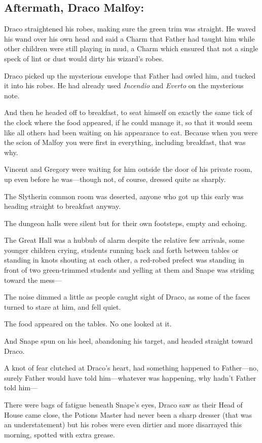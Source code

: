 \subsection{Aftermath, Draco Malfoy:}

\noindent{}Draco straightened his robes, making sure the green trim was straight. He waved his wand over his own head and said a Charm that Father had taught him while other children were still playing in mud, a Charm which ensured that not a single speck of lint or dust would dirty his wizard’s robes.

Draco picked up the mysterious envelope that Father had owled him, and tucked it into his robes. He had already used \emph{Incendio} and \emph{Everto} on the mysterious note.

And then he headed off to breakfast, to seat himself on exactly the same tick of the clock where the food appeared, if he could manage it, so that it would seem like all others had been waiting on his appearance to eat. Because when you were the scion of Malfoy you were first in everything, including breakfast, that was why.

Vincent and Gregory were waiting for him outside the door of his private room, up even before he was—though not, of course, dressed quite as sharply.

The Slytherin common room was deserted, anyone who got up this early was heading straight to breakfast anyway.

The dungeon halls were silent but for their own footsteps, empty and echoing.

The Great Hall was a hubbub of alarm despite the relative few arrivals, some younger children crying, students running back and forth between tables or standing in knots shouting at each other, a red-robed prefect was standing in front of two green-trimmed students and yelling at them and Snape was striding toward the mess—

The noise dimmed a little as people caught sight of Draco, as some of the faces turned to stare at him, and fell quiet.

The food appeared on the tables. No one looked at it.

And Snape spun on his heel, abandoning his target, and headed straight toward Draco.

A knot of fear clutched at Draco’s heart, had something happened to Father—no, surely Father would have told him—whatever was happening, why hadn’t Father told him—

There were bags of fatigue beneath Snape’s eyes, Draco saw as their Head of House came close, the Potions Master had never been a sharp dresser (that was an understatement) but his robes were even dirtier and more disarrayed this morning, spotted with extra grease.

